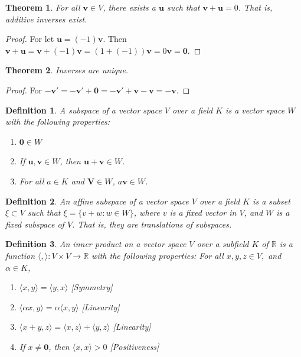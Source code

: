 \documentclass[12pt,oneside]{book}
\theoremstyle{mystyle}
\newtheorem{theorem}{Theorem}[section]
\newtheorem{definition}{Definition}[section]
\begin{document}
\begin{theorem}
For all $\mathbf{v}\in V$, there exists a $\mathbf{u}$ such that $\mathbf{v}+\mathbf{u}=0$. That is, additive inverses exist.
\end{theorem}
\begin{proof}
For let $\mathbf{u} = (-1)\mathbf{v}$. Then $\mathbf{v}+\mathbf{u} = \mathbf{v}+(-1)\mathbf{v} = (1+(-1))\mathbf{v} = 0\mathbf{v} = \mathbf{0}$.
\end{proof}

\begin{theorem}
Inverses are unique.
\end{theorem}
\begin{proof}
For $-\mathbf{v}' = -\mathbf{v}'+\mathbf{0} = -\mathbf{v}'+\mathbf{v}-\mathbf{v} = - \mathbf{v}$.
\end{proof}

\begin{definition}
A subspace of a vector space $V$ over a field $K$ is a vector space $W$ with the following properties:
\begin{enumerate}
\item $\mathbf{0} \in W$
\item If $\mathbf{u,v}\in W$, then $\mathbf{u}+\mathbf{v} \in W$.
\item For all $a\in K$ and $\mathbf{V} \in W$, $a\mathbf{v} \in W$.
\end{enumerate}
\end{definition}

\begin{definition}
An affine subspace of a vector space $V$ over a field $K$ is a subset $\xi\subset V$ such that $\xi = \{v+w:w\in W\}$, where $v$ is a fixed vector in $V$, and $W$ is a fixed subspace of $V$. That is, they are translations of subspaces.
\end{definition}

\begin{definition}
An inner product on a vector space $V$ over a subfield $K$ of $\mathbb{R}$ is a function $\langle , \rangle:V\times V\rightarrow \mathbb{R}$ with the following properties: For all $x,y,z \in V,$ and $\alpha \in K$,
\begin{enumerate}
\item $\langle x,y \rangle = \langle y,x \rangle$ \hfill [Symmetry]
\item $\langle \alpha x, y \rangle = \alpha \langle x,y \rangle$ \hfill [Linearity]
\item $\langle x+y,z \rangle = \langle x,z\rangle + \langle y,z \rangle$ \hfill [Linearity]
\item  If $x\ne \mathbf{0}$, then $\langle x,x\rangle >0$ \hfill [Positiveness]
\end{enumerate}
\end{definition}
\end{document}
